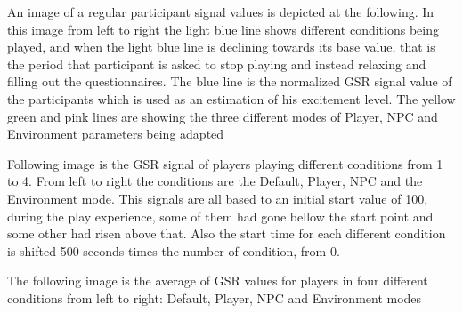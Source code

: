 An image of a regular participant signal values is depicted at
the following. In this image from left to right the light blue line
shows different conditions being played, and when the light blue
line is declining towards its base value, that is the period that
participant is asked to stop playing and instead relaxing and filling
out the questionnaires. The blue line is the normalized GSR signal
value of the participants which is used as an estimation of his
excitement level. The yellow green and pink lines are showing the
three different modes of Player, NPC and Environment parameters
being adapted

Following image is the GSR signal of players playing different
conditions from 1 to 4. From left to right the conditions are the
Default, Player, NPC and the Environment mode. This signals are all
based to an initial start value of 100, during the play experience,
some of them had gone bellow the start point and some other had risen
above that. Also the start time for each different condition is
shifted 500 seconds times the number of condition, from 0.

The following image is the average of GSR values for players in four
different conditions from left to right: Default, Player, NPC and
Environment modes
